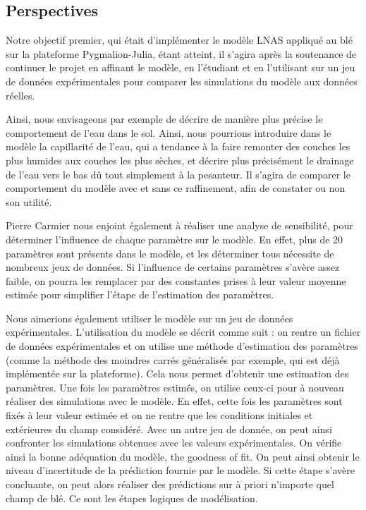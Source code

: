 \subsection{Perspectives}

Notre objectif premier, qui était d'implémenter le modèle LNAS appliqué au blé sur la plateforme Pygmalion-Julia, étant atteint, il s'agira après la soutenance de continuer le projet en affinant le modèle, en l'étudiant et en l'utilisant sur un jeu de données expérimentales pour comparer les simulations du modèle aux données réelles.

Ainsi, nous envisageons par exemple de décrire de manière plus précise le comportement de l'eau dans le sol. Ainsi, nous pourrions introduire dans le modèle la capillarité de l'eau, qui a tendance à la faire remonter des couches les plus humides aux couches les plus sèches, et décrire plus précisément le drainage de l'eau vers le bas dû tout simplement à la pesanteur. Il s'agira de comparer le comportement du modèle avec et sans ce raffinement, afin de constater ou non son utilité.

Pierre Carmier nous enjoint également à réaliser une analyse de sensibilité, pour déterminer l'influence de chaque paramètre sur le modèle. En effet, plus de 20 paramètres sont présents dans le modèle, et les déterminer tous nécessite de nombreux jeux de données. Si l'influence de certains paramètres s'avère assez faible, on pourra les remplacer par des constantes prises à leur valeur moyenne estimée pour simplifier l'étape de l'estimation des paramètres.

Nous aimerions également utiliser le modèle sur un jeu de données expérimentales. L'utilisation du modèle se décrit comme suit : on rentre un fichier de données expérimentales et on utilise une méthode d'estimation des paramètres (comme la méthode des moindres carrés généralisés par exemple, qui est déjà implémentée sur la plateforme). Cela nous permet d'obtenir une estimation des paramètres. 
Une fois les paramètres estimés, on utilise ceux-ci pour à nouveau réaliser des simulations avec 
le modèle. En effet, cette fois les paramètres sont fixés à leur valeur estimée et on ne rentre que les conditions initiales et extérieures du champ considéré.
Avec un autre jeu de donnée, on peut ainsi confronter les simulations obtenues avec les valeurs expérimentales. On vérifie ainsi la bonne adéquation du modèle, the goodness of fit. On peut ainsi obtenir le niveau d'incertitude de la prédiction fournie par le modèle.
Si cette étape s'avère concluante, on peut alors réaliser des prédictions sur à priori n'importe quel champ de blé. Ce sont les étapes logiques de modélisation. 

